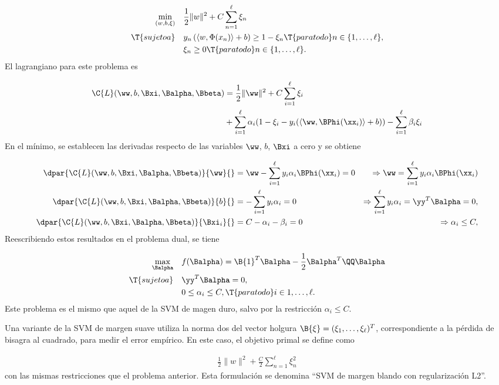 \begin{align}
\label{svm-primal-blando}
  \begin{split}
    \min_{(w,b,\xi)} \quad & \frac{1}{2}\|w\|^2+C\sum_{n=1}^{\ell}\xi_n\\
    \T{sujeto a} \quad &
    y_n\left(\langle{}w,\Phi(x_n)\rangle+b\right) \geq 1-\xi_n \T{ para todo }
    n\in\{1,\ldots,\ell\}, \\
    & \xi_n \geq 0 \T{ para todo } n\in\{1,\ldots,\ell\}.
  \end{split}
\end{align}
El lagrangiano para este problema es

\begin{align}
  \begin{split}    
  \C{L}(\ww,b,\Bxi,\Balpha,\Bbeta) &= \frac{1}{2} \|\ww\|^2 + C \sum_{i=1}^{\ell} \xi_i \\
  &+ \sum_{i=1}^{\ell} \alpha_i (1-\xi_i-y_i(\langle\ww,\BPhi(\xx_i)\rangle+b)) - \sum_{i=1}^{\ell} \beta_i\xi_i
  \end{split}
\end{align}
En el mínimo, se establecen las derivadas respecto de las variables
$\ww$, $b$, $\Bxi$ a cero y se obtiene

\begin{align}
  \dpar{ \C{L}(\ww,b,\Bxi,\Balpha,\Bbeta)}{\ww}{}
    &=\ww-\sum_{i=1}^\ell y_i\alpha_i\BPhi(\xx_i) = 0
    &\Rightarrow \ww = \sum_{i=1}^\ell y_i\alpha_i\BPhi(\xx_i)
  \\
  \dpar{ \C{L}(\ww,b,\Bxi,\Balpha,\Bbeta)}{b}{}
    &=-\sum_{i=1}^\ell y_i\alpha_i = 0
    &\Rightarrow \sum_{i=1}^\ell y_i\alpha_i = \yy^T\Balpha = 0,\\  
  \dpar{ \C{L}(\ww,b,\Bxi,\Balpha,\Bbeta)}{\Bxi_i}{}
    &=C-\alpha_i-\beta_i = 0
    &\Rightarrow \alpha_i \leq C,
\end{align}
Reescribiendo estos resultados en el problema dual, se tiene

\begin{align}
\begin{split}\label{svmprob-dual-soft}
    \max_{\Balpha} \quad
    & f(\Balpha) = \B{1}^T\Balpha-\frac{1}{2}\Balpha^T\QQ\Balpha\\
    \T{sujeto a}\quad & \yy^T\Balpha = 0, \\
                      & 0\leq\alpha_i\leq C, \T{ para todo } i\in {1,\ldots,\ell }.
\end{split}\end{align}
Este problema es el mismo que aquel de la SVM de magen duro, salvo por la restricción
$\alpha_i\leq C$.

Una variante de la SVM de margen suave utiliza la norma dos del
vector holgura $\B{\xi}=(\xi_1,\ldots,\xi_\ell)^T$, correspondiente
a la pérdida de bisagra al cuadrado, para medir el error empírico.
En este caso, el objetivo primal se define como

\begin{align}
  \label{svm-l2}
  \frac{1}{2}\|w\|^2+\frac{C}{2}\sum_{n=1}^{\ell}\xi_n^2
\end{align}
con las mismas restricciones que el problema anterior.
Esta formulación se denomina ``SVM de margen blando con regularización L2''.
